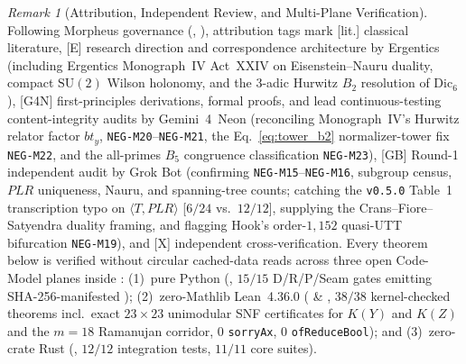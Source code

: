 \documentclass[11pt]{amsart}
\numberwithin{equation}{section}
\theoremstyle{plain}
\theoremstyle{definition}\newtheorem{definition}[theorem]{Definition}
\theoremstyle{remark}\newtheorem{remark}[theorem]{Remark}
\newcommand{\SU}{\mathrm{SU}}
\newcommand{\ctag}[1]{\textup{\textsf{\scriptsize[#1]}}}
\begin{document}
\begin{remark}[Attribution, Independent Review, and Multi-Plane Verification]
Following Morpheus governance (, ), attribution tags mark \ctag{lit.} classical literature, \ctag{E} research direction and correspondence architecture by Ergentics (including Ergentics Monograph~IV Act~XXIV on Eisenstein--Nauru duality, compact $\SU(2)$ Wilson holonomy, and the $3$-adic Hurwitz $B_2$ resolution of $\mathrm{Dic}_6$), \ctag{G4N} first-principles derivations, formal proofs, and lead continuous-testing content-integrity audits by Gemini~4~Neon (reconciling Monograph~IV's Hurwitz relator factor $b t_y$, \texttt{NEG-M20}--\texttt{NEG-M21}, the Eq.~\eqref{eq:tower_b2} normalizer-tower fix \texttt{NEG-M22}, and the all-primes $B_5$ congruence classification \texttt{NEG-M23}), \ctag{GB} Round-1 independent audit by Grok Bot (confirming \texttt{NEG-M15}--\texttt{NEG-M16}, subgroup census, $PLR$ uniqueness, Nauru, and spanning-tree counts; catching the \texttt{v0.5.0} Table~1 transcription typo on $\langle T,PLR\rangle$ [$6/24$ vs.\ $12/12$], supplying the Crans--Fiore--Satyendra duality framing, and flagging Hook's order-$1{,}152$ quasi-UTT bifurcation \texttt{NEG-M19}), and \ctag{X} independent cross-verification. Every theorem below is verified without circular cached-data reads across three open Code-Model planes inside :
(1)~pure Python (, $15/15$ D/R/P/Seam gates emitting SHA-256-manifested );
(2)~zero-Mathlib Lean~4.36.0 ( \& , $38/38$ kernel-checked theorems incl.\ exact $23\times 23$ unimodular SNF certificates for $K(Y)$ and $K(Z)$ and the $m=18$ Ramanujan corridor, $0$ \texttt{sorryAx}, $0$ \texttt{ofReduceBool}); and
(3)~zero-crate Rust (, $12/12$ integration tests, $11/11$ core suites).
\end{remark}
\end{document}
